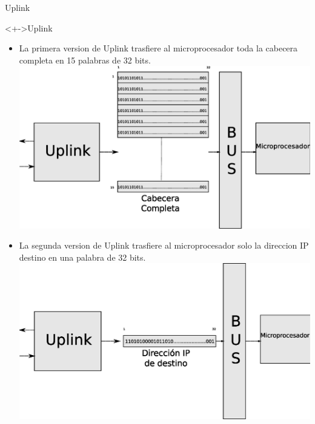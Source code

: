 \documentclass[xcolor=dvipsnames]{beamer}
\begin{document}
\begin{frame}{Uplink}
  \begin{block}<+->{Uplink}
	\begin{itemize}
      \scriptsize
	\item La primera version de Uplink trasfiere al microprocesador toda la cabecera completa en 15 palabras de 32 bits. 
	\center
	\includegraphics[scale=0.20]{figures/15pal.eps}  
	   \end{itemize}
	\begin{itemize}
      \scriptsize
	\item La segunda version de Uplink trasfiere al microprocesador solo la direccion IP destino en una palabra de 32 bits.
	\center
	\includegraphics[scale=0.20]{figures/1pal.eps}
   \end{itemize}
\end{block}
\end{frame}
\end{document}
